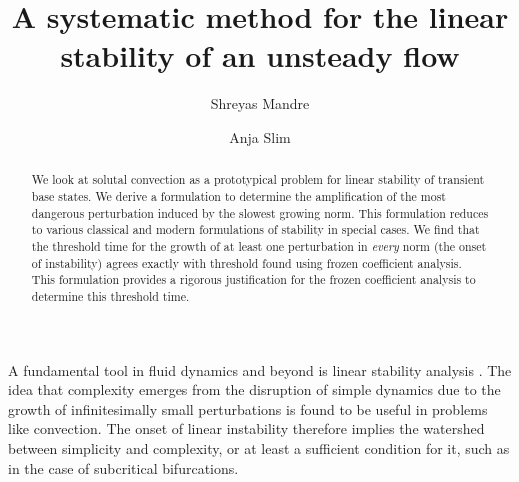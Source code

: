 \documentclass[letterpaper,prl,aps,twocolumn,reprint,superscriptaddress]{revtex4-1}
\begin{document}
\title{A systematic method for the linear stability of an unsteady flow}
\author{Shreyas Mandre}
\author{Anja Slim}
\begin{abstract}
We look at solutal convection as a prototypical problem for linear stability of transient base states. 
We derive a formulation to determine the amplification of the most dangerous perturbation induced by the slowest growing norm. 
This formulation reduces to various classical and modern formulations of stability in special cases. 
We find that the threshold time for the growth of at least one perturbation in {\em every} norm (the onset of instability) agrees exactly with threshold found using frozen coefficient analysis. 
This formulation provides a rigorous justification for the frozen coefficient analysis to determine this threshold time.
\end{abstract}
\maketitle


A fundamental tool in fluid dynamics and beyond is linear stability analysis \cite{DrazinReid}. The idea that complexity emerges from the disruption of simple dynamics due to the growth of infinitesimally small perturbations\cite{Chandrasekhar, Drazin, etc} is found to be useful in problems like convection. The onset of linear instability therefore implies the watershed between simplicity and complexity, or at least a sufficient condition for it, such as in the case of subcritical bifurcations. 


\end{document}
